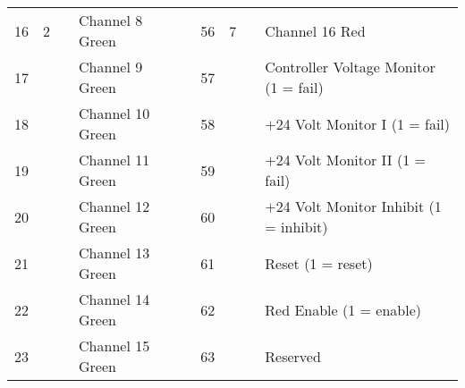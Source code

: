 \documentclass[]{article}
\begin{document}
\begin{landscape}
\begin{table}[]
\begin{tabular}{lllllllll}
			16                       & \multirow{-8}{*}{2}      & \multirow{-8}{*}{}       & Channel 8 Green                &                    & 56                                                    & \multirow{-8}{*}{7}  & \multirow{-8}{*}{} & Channel 16 Red                                    \\ \cline{1-4} \cline{6-9} 
			17                       &                          &                          & Channel 9 Green                &                    & 57                                                    &                      &                    & Controller Voltage Monitor (1 = fail)             \\
			18                       &                          &                          & Channel 10 Green               &                    & 58                                                    &                      &                    & $+$24 Volt Monitor I  (1 = fail)                  \\
			19                       &                          &                          & Channel 11 Green               &                    & 59                                                    &                      &                    & $+$24 Volt Monitor II (1 = fail)                  \\
			20                       &                          &                          & Channel 12 Green               &                    & 60                                                    &                      &                    & $+$24 Volt Monitor Inhibit (1 = inhibit)          \\
			21                       &                          &                          & Channel 13 Green               &                    & 61                                                    &                      &                    & Reset (1 = reset)                                 \\
			22                       &                          &                          & Channel 14 Green               &                    & 62                                                    &                      &                    & Red Enable (1 = enable)                           \\
			23                       &                          &                          & Channel 15 Green               &                    & 63                                                    &                      &                    & Reserved                                          \\

\end{tabular}
\end{table}
\end{landscape}
\end{document}
